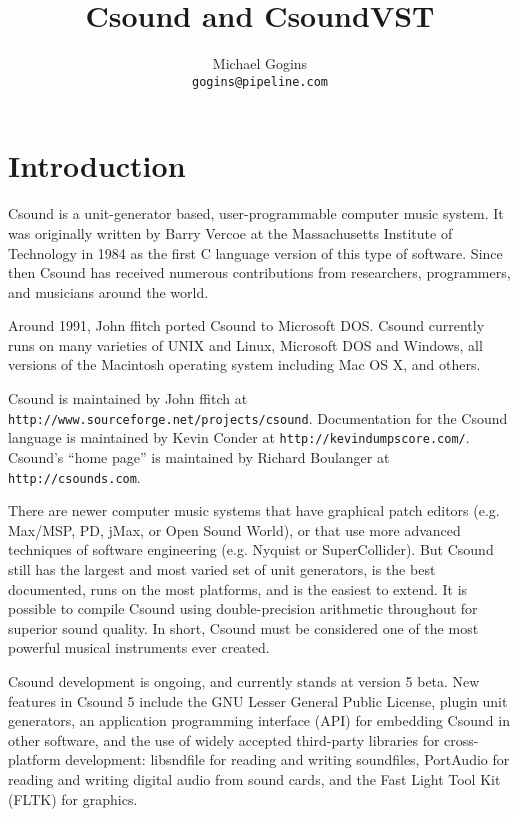 \documentclass[10pt,letterpaper,onecolumn]{ltxguide}
\begin{document}
\title{Csound and CsoundVST}
\author{Michael Gogins \\ \texttt{gogins@pipeline.com}}
\maketitle


\section{Introduction}

Csound is a unit-generator based, user-programmable computer music system. It was originally written by Barry Vercoe at the Massachusetts Institute of Technology in 1984 as the first C language version of this type of software. Since then Csound has received numerous contributions from researchers, programmers, and musicians around the world. 

Around 1991, John ffitch ported Csound to Microsoft DOS. Csound currently runs on many varieties of UNIX and Linux, Microsoft DOS and Windows, all versions of the Macintosh operating system including Mac OS X, and others.

Csound is maintained by John ffitch at \linebreak[4] \texttt{http://www.sourceforge.net/projects/csound}. Documentation for the Csound language is maintained by Kevin Conder at \linebreak[4] \texttt{http://kevindumpscore.com/}. Csound's ``home page'' is maintained by Richard Boulanger at \linebreak[3] \texttt{http://csounds.com}. 

There are newer computer music systems that have graphical patch editors (e.g. Max/MSP, PD, jMax, or Open Sound World), or that use more advanced techniques of software engineering (e.g. Nyquist or SuperCollider). But Csound still has the largest and most varied set of unit generators, is the best documented, runs on the most platforms, and is the easiest to extend. It is possible to compile Csound using double-precision arithmetic throughout for superior sound quality. In short, Csound must be considered one of the most powerful musical instruments ever created.

Csound development is ongoing, and currently stands at version 5 beta. New features in Csound 5 include the GNU Lesser General Public License, plugin unit generators, an application programming interface (API) for embedding Csound in other software, and the use of widely accepted third-party libraries for cross-platform development: libsndfile for reading and writing soundfiles, PortAudio for reading and writing digital audio from sound cards, and the Fast Light Tool Kit (FLTK) for graphics.
\end{document}
